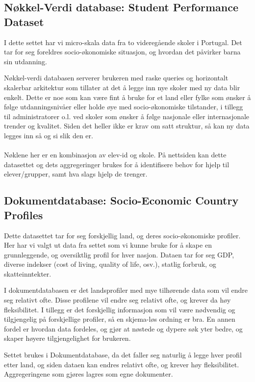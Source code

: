 \subsection{Nøkkel-Verdi database: Student Performance Dataset}
I dette settet har vi micro-skala data fra to videregående skoler i Portugal. Det tar for seg foreldres socio-økonomiske situasjon, og hvordan det påvirker barna sin utdanning.

Nøkkel-verdi databasen serverer brukeren med raske queries og horizontalt skalerbar arkitektur som tillater at det å legge inn nye skoler med ny data blir enkelt. Dette er noe som kan være fint å bruke for et land eller fylke som ønsker å følge utdanningsnivåer eller holde øye med socio-økonomiske tilstander, i tillegg til administratorer o.l. ved skoler som ønsker å følge nasjonale eller internasjonale trender og kvalitet. Siden det heller ikke er krav om satt struktur, så kan ny data legges inn så og si slik den er.
\paragraph{}
Nøklene her er en kombinasjon av elev-id og skole. På nettsiden kan dette datasettet og dets aggregeringer brukes for å identifisere behov for hjelp til elever/grupper, samt hva slags hjelp de trenger.

\subsection{Dokumentdatabase: Socio-Economic Country Profiles}
Dette datasettet tar for seg forskjellig land, og deres socio-økonomiske profiler. Her har vi valgt ut data fra settet som vi kunne bruke for å skape en grunnleggende, og oversiktlig profil for hver nasjon. Dataen tar for seg GDP, diverse indekser (cost of living, quality of life, osv.), statlig forbruk, og skatteinntekter.

I dokumentdatabasen er det landsprofiler med mye tilhørende data som vil endre seg relativt ofte. Disse profilene vil endre seg relativt ofte, og krever da høy fleksibilitet. I tillegg er det forskjellig informasjon som vil være nødvendig og tilgjengelig på forskjellige profiler, så en skjema-løs ordning er bra. En annen fordel er hvordan data fordeles, og gjør at nøstede og dypere søk yter bedre, og skaper høyere tilgjengelighet for brukeren.

Settet brukes i Dokumentdatabase, da det faller seg naturlig å legge hver profil etter land, og siden dataen kan endres relativt ofte, og krever høy fleksibilitet. Aggregeringene som gjøres lagres som egne dokumenter.

